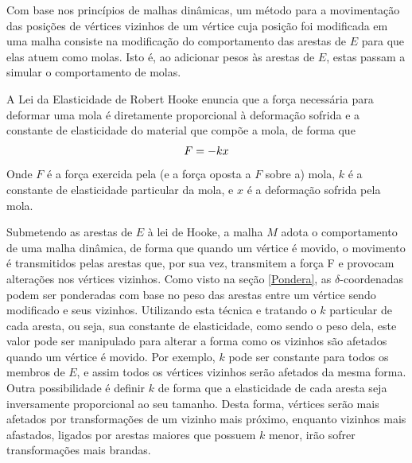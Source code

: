 Com base nos princípios de malhas dinâmicas, um método para a movimentação das posições de vértices vizinhos de um vértice cuja posição foi modificada em uma malha consiste na modificação do comportamento das arestas de $E$ para que elas atuem como molas. 
Isto é, ao adicionar pesos às arestas de $E$, estas passam a simular o comportamento de molas.
\begin{defi}
A Lei da Elasticidade de Robert Hooke enuncia que a força necessária para deformar uma mola é diretamente proporcional à deformação sofrida e a constante de elasticidade do material que compõe a mola, de forma que 
\begin{equation}
    \mathbf{\mathcal}F = -kx
\end{equation}
Onde $F$ é a força exercida pela (e a força oposta a $F$ sobre a) mola, $k$ é a constante de elasticidade particular da mola, e $x$ é a deformação sofrida pela mola.
\end{defi}
Submetendo as arestas de $E$ à lei de Hooke, a malha $M$ adota o comportamento de uma malha dinâmica, de forma que quando um vértice é movido, o movimento é transmitidos pelas arestas que, por sua vez, transmitem a força F e provocam alterações nos vértices vizinhos.
Como visto na seção \ref{Pondera}, as $\delta$-coordenadas podem ser ponderadas com base no peso das arestas entre um vértice sendo modificado e seus vizinhos. Utilizando esta técnica e tratando o $k$ particular de cada aresta, ou seja, sua constante de elasticidade, como sendo o peso dela, este valor pode ser manipulado para alterar a forma como os vizinhos são afetados quando um vértice é movido. Por exemplo, $k$ pode ser constante para todos os membros de $E$, e assim todos os vértices vizinhos serão afetados da mesma forma. Outra possibilidade é definir $k$ de forma que a elasticidade de cada aresta seja inversamente proporcional ao seu tamanho. Desta forma, vértices serão mais afetados por transformações de um vizinho mais próximo, enquanto vizinhos mais afastados, ligados por arestas maiores que possuem $k$ menor, irão sofrer transformações mais brandas.